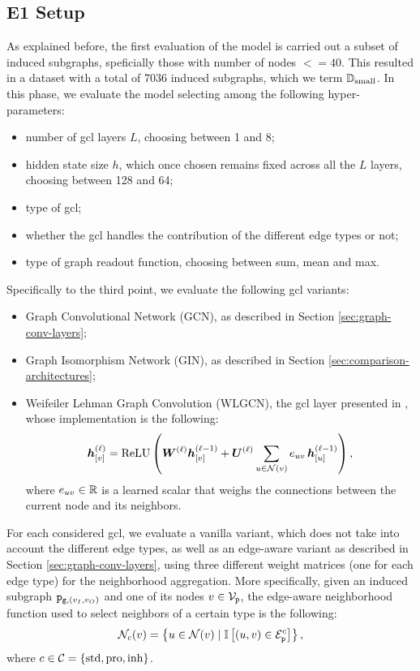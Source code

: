 \subsection{E1 Setup}
As explained before, the first evaluation of the model is carried out a subset of induced subgraphs, speficially those with number of nodes $<= 40$. This resulted in a dataset with a total of 7036 induced subgraphs, which we term $\mathbb{D}_{\mathrm{small}}$. In this phase, we evaluate the model selecting among the following hyper-parameters:
\begin{itemize}
    \item number of \gls{gcl} layers $L$, choosing between 1 and 8;
    \item hidden state size $h$, which once chosen remains fixed across all the $L$ layers, choosing between 128 and 64;
    \item type of \gls{gcl};
    \item whether the \gls{gcl} handles the contribution of the different edge types or not;
    \item type of graph readout function, choosing between sum, mean and max.
\end{itemize}
Specifically to the third point, we evaluate the following \gls{gcl} variants:
\begin{itemize}
    \item Graph Convolutional Network (GCN), as described in Section \ref{sec:graph-conv-layers};
    \item Graph Isomorphism Network (GIN), as described in Section \ref{sec:comparison-architectures};
    \item Weifeiler Lehman Graph Convolution (WLGCN), \ie the \gls{gcl} layer presented in \citep{morris2019weisfeilerlehmangoneural}, whose implementation is the following:
    $$\StateVector{v}{\ell} = \relu\Par{\LayerMatrix{W}{\ell} \StateVector{v}{\ell-1} + \LayerMatrix{U}{\ell} \sum_{u \in \Neigh(v)} e_{uv}\, \StateVector{u}{\ell-1}},$$
    where $e_{uv} \in \mathbb{R}$ is a learned scalar that weighs the connections between the current node and its neighbors.
\end{itemize}
For each considered \gls{gcl}, we evaluate a vanilla variant, which does not take into account the different edge types, as well as an edge-aware variant as described in Section \ref{sec:graph-conv-layers}, using three different weight matrices (one for each edge type) for the neighborhood aggregation. More specifically, given an induced subgraph $\mathtt{p}_{\mathtt{g}, (v_I,v_O)}$ and one of its nodes $v \in \Nodes{p}$, the edge-aware neighborhood function used to select neighbors of a certain type is the following:
$$\Neigh_c(v) = \Set{u \in \Neigh(v) \mid \Indicator{(u,v) \in \Edges{p}^c}},$$
where $c \in \Cal{C} = \Set{\Fun{std}, \Fun{pro}, \Fun{inh}}$.

